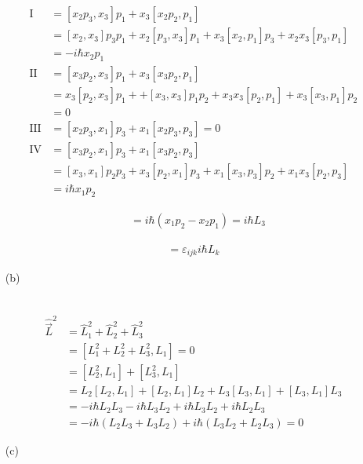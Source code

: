 \documentclass[11pt,a4paper]{article}
\begin{document}
\begin{enumerate}
\begin{align}
    \mbox{I}
    &=[x_2p_3,x_3]p_1+x_3[x_2p_2,p_1]\\
    &=[x_2,x_3]p_3p_1+x_2[p_3,x_3]p_1+x_3[x_2,p_1]p_3+x_2x_3[p_3,p_1]\\
    &=-i\hbar x_2p_1\\
    \mbox{II}
    &=[x_3p_2,x_3]p_1+x_3[x_3p_2,p_1]\\
    &=x_3[p_2,x_3]p_1++[x_3,x_3]p_1p_2+x_3x_3[p_2,p_1]+x_3[x_3,p_1]p_2\\
    &=0\\
    \mbox{III}
    &=[x_2p_3,x_1]p_3+x_1[x_2p_3,p_3]=0\\
    \mbox{IV}
    &=[x_3p_2,x_1]p_3+x_1[x_3p_2,p_3]\\
    &=[x_3,x_1]p_2p_3+x_3[p_2,x_1]p_3+x_1[x_3,p_3]p_2+x_1x_3[p_2,p_3]\\
    &=i\hbar x_1p_2
\end{align}

\begin{align}
    [L_1,L_2]&=i\hbar(x_1p_2-x_2p_1)=i\hbar L_3
\end{align}

\begin{align}
    [L_i,L_j]=\varepsilon_{ijk}i\hbar L_k
\end{align}

\item[(b)]

\begin{align}
    [\hat{\vec{L}}_1^2,\hat{L}_1]
\end{align}

\begin{align}
    \hat{\vec{L}}^2&=\hat{L}_1^2+\hat{L}_2^2+\hat{L}_3^2\\
    &=[L_1^2+L_2^2+L_3^2,L_1]=0\\
    &=[L_2^2,L_1]+[L_3^2,L_1]\\
    &=L_2[L_2,L_1]+[L_2,L_1]L_2+L_3[L_3,L_1]+[L_3,L_1]L_3\\
        &=-i\hbar L_2L_3-i\hbar L_3L_2+i\hbar L_3L_2+i\hbar L_2L_3\\
&=-i\hbar(L_2L_3+L_3L_2)+i\hbar(L_3L_2+L_2L_3)=0
\end{align}

\item[(c)]


\end{enumerate}
\end{document}
